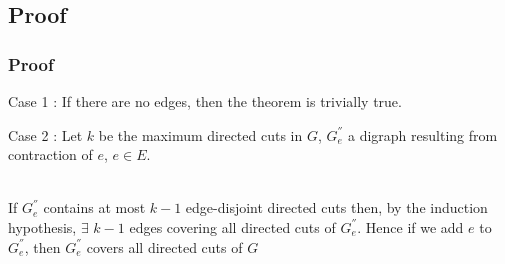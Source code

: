 \documentclass[8pt]{beamer}
\begin{document}

\subsection{Proof}
\begin{frame}
\frametitle{Proof}
\begin{block}{Case 1 :}
If there are no edges, then the theorem is trivially true. 
\end{block}

\begin{block}{Case 2 :}
Let $k$ be the maximum directed cuts in $G$, $G_e^{''}$ a digraph resulting from contraction of $e$, $e\in E$. 
\end{block}

\begin{block}\\
If $G_e^{''}$ contains at most $k-1$ edge-disjoint directed cuts then, by the induction hypothesis, $\exists$ $k-1$ edges covering all directed cuts of $G_e^{''}$. Hence if we add $e$ to $G_e^{''}$, then $G_e^{''}$ covers all directed cuts of $G$
\end{block}


\end{frame}
\end{document}
